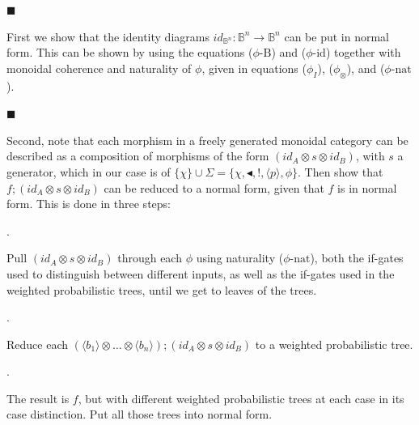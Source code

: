 \documentclass[10pt,a4paper]{article}
\begin{document}
\par\noindent  $\blacksquare$ 
 
First we show that the identity diagrams $\textit{id}_{\mathbb{B}^{n}}:\mathbb{B}^{n}\to\mathbb{B}^{n}$ can be put in normal form. This can be shown by using the equations ($\phi\text{-B}$) and ($\phi\text{-id}$) together with monoidal coherence and naturality of $\phi$, given in equations ($\phi_I$), ($\phi_{\otimes}$), and ($\phi\text{-nat}$).\par
 
 
 
\par\noindent  $\blacksquare$ 
 
Second, note that each morphism in a freely generated monoidal category can be described as a composition of morphisms of the form $(\textit{id}_{A}\otimes s\otimes\textit{id}_{B})$, with $s$ a generator, which in our case is of $\{\chi\}\cup\Sigma=\{\chi,\blacktriangleleft,!,\langle p\rangle,\phi\}$. Then show that $f;(\textit{id}_{A}\otimes s\otimes\textit{id}_{B})$ can be reduced to a normal form, given that $f$ is in normal form. This is done in three steps:\par
  
\par{}. 
 
Pull $(\textit{id}_{A}\otimes s\otimes\textit{id}_{B})$ through each $\phi$ using naturality ($\phi\text{-nat}$), both the if-gates used to distinguish between different inputs, as well as the if-gates used in the weighted probabilistic trees, until we get to leaves of the trees.\par
 
 
 
\par{}. 
 
Reduce each $(\langle b_{1}\rangle\otimes\dots\otimes\langle b_{n}\rangle);(\textit{id}_{A}\otimes s\otimes\textit{id}_{B})$ to a weighted probabilistic tree.\par
 
 
 
\par{}. 
 
The result is $f$, but with different weighted probabilistic trees at each case in its case distinction. Put all those trees into normal form.\par
 
\end{document}
